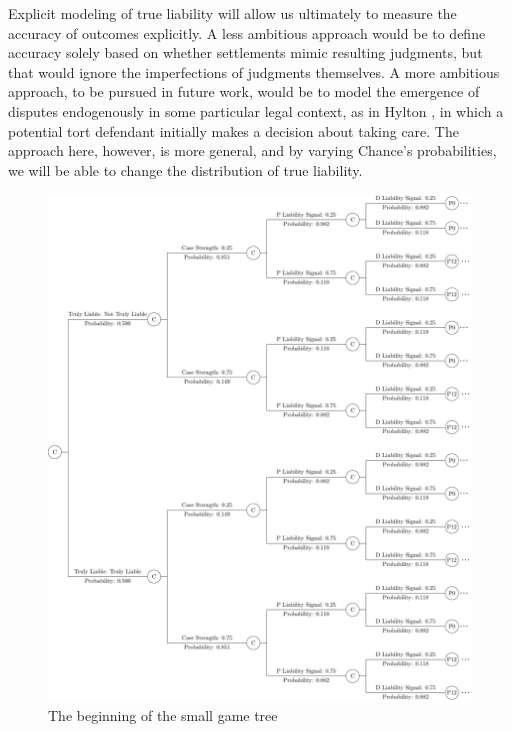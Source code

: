 \documentclass{article}
\begin{document}
Explicit modeling of true liability will allow us ultimately to measure the accuracy of outcomes explicitly. A less ambitious approach would be to define accuracy solely based on whether settlements mimic resulting judgments, but that would ignore the imperfections of judgments themselves. A more ambitious approach, to be pursued in future work, would be to model the emergence of disputes endogenously in some particular legal context, as in Hylton \cite{hylton}, in which a potential tort defendant initially makes a decision about taking care. The approach here, however, is more general, and by varying Chance's probabilities, we will be able to change the distribution of true liability. 

\begin{figure}[h!]
\centering
\includegraphics[scale=0.25, trim={0in 0in 0in 0in}, clip]{../Figures/game tree 2x2x2 beginning.pdf}
\caption{The beginning of the small game tree}
\label{fig:gametree2x2x2beginning}
\end{figure}
\end{document}
